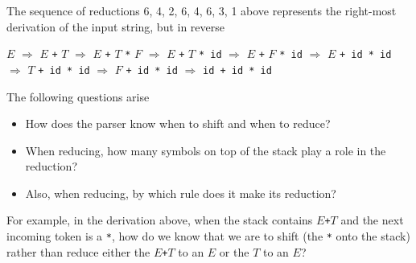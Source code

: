 \documentclass[8pt,a4paper,compress,handout]{beamer}
\newcommand{\mm}[1]{$#1$}
\newenvironment{spaced}
{
\smallskip
\hspace{.5cm}
\begin{minipage}[c]{\textwidth}
}
{
\end{minipage}
\smallskip
}
\begin{document}
\begin{frame}[fragile]
\pause

The sequence of reductions 6, 4, 2, 6, 4, 6, 3, 1 above represents the right-most derivation of the input string, but in reverse

\text{ }
\begin{spaced}
\begin{production}
\underline{\mm{E}} \mm{\Rightarrow} \mm{E} \lstinline{+} \underline{\mm{T}}
   \mm{\Rightarrow} \mm{E} \lstinline{+} \mm{T} \lstinline{*} \underline{\mm{F}}
   \mm{\Rightarrow} \mm{E} \lstinline{+} \underline{\mm{T}} \lstinline{* id}
   \mm{\Rightarrow} \mm{E} \lstinline{+} \underline{\mm{F}} \lstinline{* id}
   \mm{\Rightarrow} \underline{\mm{E}} \lstinline{+ id * id}
   \mm{\Rightarrow} \underline{\mm{T}} \lstinline{+ id * id}
   \mm{\Rightarrow} \underline{\mm{F}} \lstinline{+ id * id}
   \mm{\Rightarrow} \lstinline{id + id * id}
\end{production}
\end{spaced}

\pause
\bigskip

The following questions arise
\begin{itemize}
\item How does the parser know when to shift and when to reduce?
\item When reducing, how many symbols on top of the stack play a role in the reduction?
\item Also, when reducing, by which rule does it make its reduction?
\end{itemize}

\pause
\bigskip

For example, in the derivation above, when the stack contains $E$\lstinline{+}$T$ and the next incoming token is a \lstinline{*}, how do we know that we are to shift (the \lstinline{*} onto the stack) rather than reduce either the $E$\lstinline{+}$T$ to an $E$ or the $T$ to an $E$?
\end{frame}
\end{document}

